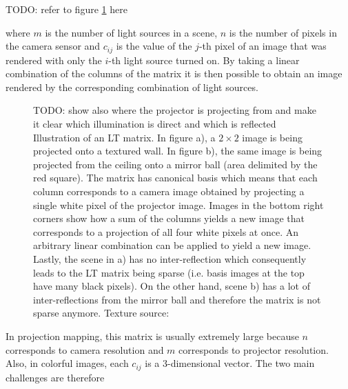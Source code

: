 {\color{red} TODO: refer to figure \ref{fig:background_lt_capture} here}

where \(m\) is the number of light sources in a scene, \(n\) is the number of pixels in the camera sensor and \(c_{ij}\) is the value of the \(j\)-th pixel of an image that was rendered with only the \(i\)-th light source turned on. By taking a linear combination of the columns of the matrix it is then possible to obtain an image rendered by the corresponding combination of light sources.

\begin{figure}[]
    \centering
    \begin{subfigure}[b]{\textwidth}
        \centering
        \def\svgwidth{\textwidth}
        
        \caption{}
    \end{subfigure}
    
    \begin{subfigure}[b]{\textwidth}
        \centering
        \def\svgwidth{\textwidth}
        
        \caption{}
    \end{subfigure}
    \caption{{\color{red} TODO: show also where the projector is projecting from and make it clear which illumination is direct and which is reflected} Illustration of an LT matrix. In figure a), a \(2 \times 2\) image is being projected onto a textured wall. In figure b), the same image is being projected from the ceiling onto a mirror ball (area delimited by the red square). The matrix has canonical basis which means that each column corresponds to a camera image obtained by projecting a single white pixel of the projector image. Images in the bottom right corners show how a sum of the columns yields a new image that corresponds to a projection of all four white pixels at once. An arbitrary linear combination can be applied to yield a new image. Lastly, the scene in a) has no inter-reflection which consequently leads to the LT matrix being sparse (i.e. basis images at the top have many black pixels). On the other hand, scene b) has a lot of inter-reflections from the mirror ball and therefore the matrix is not sparse anymore. Texture source: \citet{Pixar128}}
    \label{fig:background_lt_capture}
\end{figure}

In projection mapping, this matrix is usually extremely large because \(n\) corresponds to camera resolution and \(m\) corresponds to projector resolution. Also, in colorful images, each \(c_{ij}\) is a 3-dimensional vector. The two main challenges are therefore

